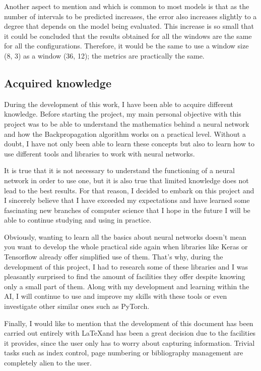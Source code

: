 Another aspect to mention and which is common to most models is that as the number of intervals to be predicted increases, the error also increases slightly to a degree that depends on the model being evaluated. This increase is so small that it could be concluded that the results obtained for all the windows are the same for all the configurations. Therefore, it would be the same to use a window size (8, 3) as a window (36, 12); the metrics are practically the same.

\subsection{Acquired knowledge}

During the development of this work, I have been able to acquire different knowledge. Before starting the project, my main personal objective with this project was to be able to understand the mathematics behind a neural network and how the Backpropagation algorithm works on a practical level. Without a doubt, I have not only been able to learn these concepts but also to learn how to use different tools and libraries to work with neural networks.
\newline

It is true that it is not necessary to understand the functioning of a neural network in order to use one, but it is also true that limited knowledge does not lead to the best results. For that reason, I decided to embark on this project and I sincerely believe that I have exceeded my expectations and have learned some fascinating new branches of computer science that I hope in the future I will be able to continue studying and using in practice.
\newline

Obviously, wanting to learn all the basics about neural networks doesn't mean you want to develop the whole practical side again when libraries like Keras or Tensorflow already offer simplified use of them. That's why, during the development of this project, I had to research some of these libraries and I was pleasantly surprised to find the amount of facilities they offer despite knowing only a small part of them. Along with my development and learning within the AI, I will continue to use and improve my skills with these tools or even investigate other similar ones such as PyTorch.
\newline

Finally, I would like to mention that the development of this document has been carried out entirely with \LaTeX and has been a great decision due to the facilities it provides, since the user only has to worry about capturing information. Trivial tasks such as index control, page numbering or bibliography management are completely alien to the user.
\newline


